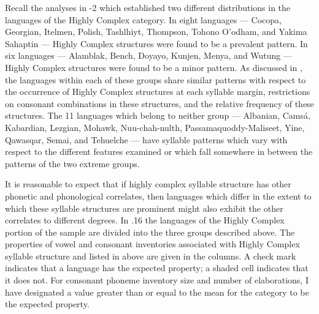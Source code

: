   Recall the analyses in -2 which established two different distributions in the languages of the Highly Complex category. In eight languages — Cocopa, Georgian, Itelmen, Polish, Tashlhiyt, Thompson, Tohono O’odham, and Yakima Sahaptin — Highly Complex structures were found to be a prevalent pattern. In six languages — Alamblak, Bench, Doyayo, Kunjen, Menya, and Wutung — Highly Complex structures were found to be a minor pattern. As discussed in , the languages within each of these groups share similar patterns with respect to the occurrence of Highly Complex structures at each syllable margin, restrictions on consonant combinations in these structures, and the relative frequency of these structures. The 11 languages which belong to neither group — Albanian, Camsá, Kabardian, Lezgian, Mohawk, Nuu-chah-nulth, Passamaquoddy-Maliseet, Yine, Qawasqar, Semai, and Tehuelche — have syllable patterns which vary with respect to the different features examined or which fall somewhere in between the patterns of the two extreme groups.

  It is reasonable to expect that if highly complex syllable structure has other phonetic and phonological correlates, then languages which differ in the extent to which these syllable structures are prominent might also exhibit the other correlates to different degrees. In .16 the languages of the Highly Complex portion of the sample are divided into the three groups described above. The properties of vowel and consonant inventories associated with Highly Complex syllable structure and listed in  above are given in the columns. A check mark indicates that a language has the expected property; a shaded cell indicates that it does not. For consonant phoneme inventory size and number of elaborations, I have designated a value greater than or equal to the mean for the category to be the expected property.

